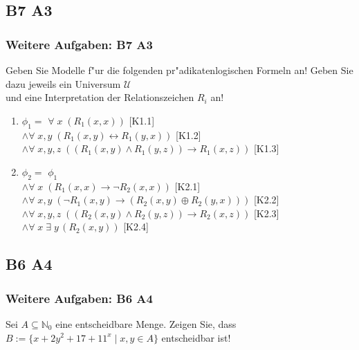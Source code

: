 \subsection{B7 A3}
\begin{frame}
	\frametitle{Weitere Aufgaben: B7 A3}
	Geben Sie Modelle f"ur die folgenden pr"adikatenlogischen Formeln an! Geben Sie dazu
	jeweils ein Universum $\mathcal{U}$\\
	und eine Interpretation der Relationszeichen $R_i$ an!
	\begin{enumerate}
		\item $\phi_1 =$ \hspace*{0.2cm} $\forall \; x \; (R_1(x,x))$ \hspace*{5.3cm}[K1.1]\\
		\hspace*{0.85cm} $\wedge \forall \; x,y \; (R_1(x,y) \leftrightarrow R_1(y,x))$
		\hspace*{3.2cm} [K1.2]\\
		\hspace*{0.85cm} $\wedge \forall \; x,y,z \; ((R_1(x,y) \wedge R_1(y,z)) \rightarrow
		R_1(x,z))$ \hspace*{1cm} [K1.3]
		\item $\phi_2 =$ \hspace*{0.2cm} $\phi_1$\\
		\hspace*{0.85cm} $\wedge \forall \; x \; (R_1(x,x) \rightarrow \neg R_2(x,x))$
		\hspace*{3.25cm} [K2.1]\\
		\hspace*{0.85cm} $\wedge \forall \; x,y \; (\neg R_1(x,y) \rightarrow (R_2(x,y)
		\oplus R_2(y,x)))$ \hspace*{1cm} [K2.2]\\
		\hspace*{0.85cm} $\wedge \forall \; x,y,z \; ((R_2(x,y) \wedge R_2(y,z)) \rightarrow
		R_2(x,z))$ \hspace*{1cm}  [K2.3]\\
		\hspace*{0.85cm} $\wedge \forall \; x \; \exists \; y \, (R_2(x,y))$ \hspace*{4.8cm}
		[K2.4]
	\end{enumerate}
\end{frame}
\subsection{B6 A4}
\begin{frame}
	\frametitle{Weitere Aufgaben: B6 A4}
	Sei $A \subseteq \mathbb{N}_0$ eine entscheidbare Menge. Zeigen Sie, dass
	$ B := \{x+2y^2+17+11^x \; | \; x,y \in A\}$ entscheidbar ist!
\end{frame}

